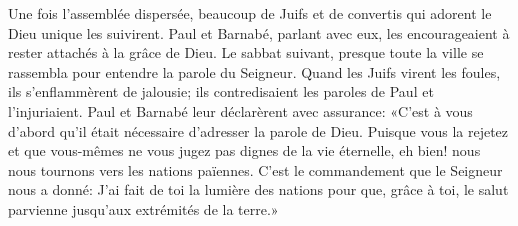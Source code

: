Une fois l’assemblée dispersée,
	beaucoup de Juifs et de convertis qui adorent le Dieu unique les suivirent.
Paul et Barnabé, parlant avec eux,
	les encourageaient à rester attachés à la grâce de Dieu.
Le sabbat suivant,
	presque toute la ville se rassembla pour entendre la parole du Seigneur.
Quand les Juifs virent les foules, ils s’enflammèrent de jalousie;
	ils contredisaient les paroles de Paul et l’injuriaient.
Paul et Barnabé leur déclarèrent avec assurance:
	«C’est à vous d’abord qu’il était nécessaire d’adresser la parole de Dieu.
Puisque vous la rejetez et que vous-mêmes ne vous jugez pas dignes de la vie éternelle,
	eh bien! nous nous tournons vers les nations païennes.
C’est le commandement que le Seigneur nous a donné:
	J’ai fait de toi la lumière des nations
	pour que, grâce à toi, le salut parvienne jusqu’aux extrémités de la terre.»
